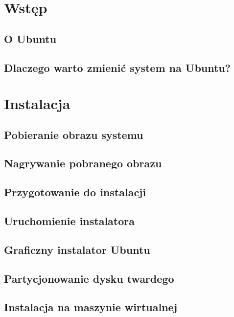 \documentclass[a4paper,11pt,oneside]{mwart}
\begin{document}


	\section{Wstęp}
	
		\subsection{O Ubuntu}
			
		\subsection{Dlaczego warto zmienić system na Ubuntu?}
			
	\section{Instalacja}
		\subsection{Pobieranie obrazu systemu}
			
		\subsection{Nagrywanie pobranego obrazu}
			
			
		\subsection{Przygotowanie do instalacji}
			
		\subsection{Uruchomienie instalatora}
			
		\subsection{Graficzny instalator Ubuntu}
			
		\subsection{Partycjonowanie dysku twardego}
			
		\subsection{Instalacja na maszynie wirtualnej}
			
\end{document}
